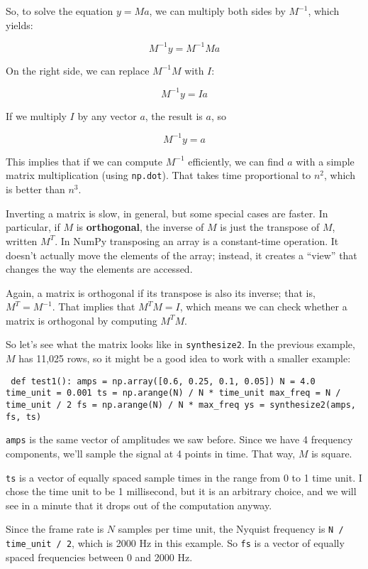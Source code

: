 \documentclass[12pt]{book} \usepackage[width=5.5in,height=8.5in, hmarginratio=3:2,vmarginratio=1:1]{geometry}
\begin{document}
So, to solve the equation $y = Ma$, we can multiply both sides by $M^{-1}$, which yields: 

%
\[ M^{-1}y = M^{-1} M a \] 

%
On the right side, we can replace $M^{-1}M$ with $I$: 

%
\[ M^{-1}y = I a \] 

%
If we multiply $I$ by any vector $a$, the result is $a$, so 

%
\[ M^{-1}y = a \] 

%
This implies that if we can compute $M^{-1}$ efficiently, we can find $a$ with a simple matrix multiplication (using {\tt np.dot}). That takes time proportional to $n^2$, which is better than $n^3$. 

Inverting a matrix is slow, in general, but some special cases are faster. In particular, if $M$ is {\bf orthogonal}, the inverse of $M$ is just the transpose of $M$, written $M^T$. In NumPy transposing an array is a constant-time operation. It doesn't actually move the elements of the array; instead, it creates a ``view'' that changes the way the elements are accessed. 

Again, a matrix is orthogonal if its transpose is also its inverse; that is, $M^T = M^{-1}$. That implies that $M^TM = I$, which means we can check whether a matrix is orthogonal by computing $M^TM$. 

So let's see what the matrix looks like in {\tt synthesize2}. In the previous example, $M$ has 11,025 rows, so it might be a good idea to work with a smaller example: 

\begin{verbatim} def test1(): amps = np.array([0.6, 0.25, 0.1, 0.05]) N = 4.0 time_unit = 0.001 ts = np.arange(N) / N * time_unit max_freq = N / time_unit / 2 fs = np.arange(N) / N * max_freq ys = synthesize2(amps, fs, ts) \end{verbatim} 

{\tt amps} is the same vector of amplitudes we saw before. Since we have 4 frequency components, we'll sample the signal at 4 points in time. That way, $M$ is square. 

{\tt ts} is a vector of equally spaced sample times in the range from 0 to 1 time unit. I chose the time unit to be 1 millisecond, but it is an arbitrary choice, and we will see in a minute that it drops out of the computation anyway. 

Since the frame rate is $N$ samples per time unit, the Nyquist frequency is \verb"N / time_unit / 2", which is 2000 Hz in this example. So {\tt fs} is a vector of equally spaced frequencies between 0 and 2000 Hz. 
\end{document}
